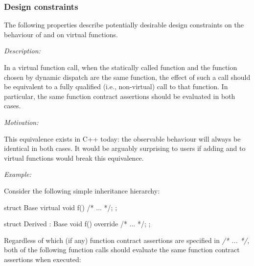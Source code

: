 \newcommand{\propref}[1]{\hyperref[#1]{\tcode{#1}}}



\subsubsection{Design constraints}

The following properties describe potentially desirable design constraints on the behaviour of  and  on virtual functions.




\emph{Description:}

In a virtual function call, when the statically called function and the function chosen by dynamic dispatch are the same function, the effect of such a call should be equivalent to a fully qualified (i.e., non-virtual) call to that function. In particular, the same function contract assertions should be evaluated in both cases.

\emph{Motivation:}

This equivalence exists in C++ today: the observable behaviour will always be identical in both cases. It would be arguably surprising to users if adding  and  to virtual functions would break this equivalence.

\emph{Example:}

Consider the following simple inheritance hierarchy:

\begin{codeblock}
struct Base {
  virtual void f() /* ... */;
};

struct Derived : Base {
  void f() override /* ... */;
};
\end{codeblock}
Regardless of which (if any) function contract assertions are specified in \textit{/* ... */}, both of the following function calls should evaluate the same function contract assertions when executed:

